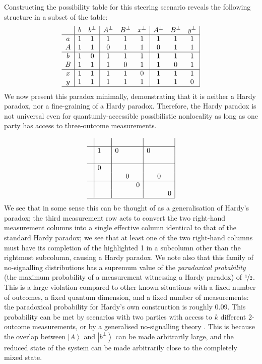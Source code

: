 \documentclass[reprint]{revtex4-1}
\theoremstyle{definition}
\newcommand{\ket}[1]{{\left\vert{#1}\right\rangle}}
\begin{document}
Constructing the possibility table for this steering scenario reveals the following structure in a subset of the table:
\begin{equation*}
\begin{array}{ c  | c c | c c c| c c c|}\
  & b&b^\perp& A^\perp &B^\perp&x^\perp& A^\perp &B^\perp&y^\perp \\ \hline
  a &1&1&1&1&1&1&1&1\\ 
  A &1&1&0&1&1&0&1&1\\ \hline
  b &1&0&1&1&1&1&1&1\\ 
 B  &1&1&1&0&1&1&0&1\\ \hline
 x &1&1&1&1&0&1&1&1\\ 
 y &1&1&1&1&1&1&1&0\\ \hline
\end{array}
\end{equation*}
We now present this paradox minimally, demonstrating that it is neither a Hardy paradox, nor a fine-graining of a Hardy paradox. Therefore, the Hardy paradox is not universal even for quantumly-accessible possibilistic nonlocality as long as one party has access to three-outcome measurements. 

\begin{equation*}
\begin{array}{ c | c c | c c c| c c c|}
&&&&&&&& \\ \hline
&1&&0&&&0&&\\
   &&&&&&&&\\ \hline
   &0&&&&&&&\\ 
  &&&&0&&&0&\\ \hline
  &&&&&0&&&\\ 
  &&&&&&&&0\\ \hline
\end{array}
\end{equation*}
We see that in some sense this can be thought of as a generalisation of Hardy's paradox; the third measurement row acts to convert the two right-hand measurement columns into a single effective column identical to that of the standard Hardy paradox; we see that at least one of the two right-hand columns must have its completion of the highlighted 1 in a subcolumn other than the rightmost subcolumn, causing a Hardy paradox. We note also that this family of no-signalling distributions has a supremum value of the \emph{paradoxical probability} (the maximum probability of a measurement witnessing a Hardy paradox) of $\nicefrac{1}{2}$. This is a large violation compared to other known situations with a fixed number of outcomes, a fixed quantum dimension, and a fixed number of measurements: the paradoxical probability for Hardy's own construction is roughly 0.09. This probability can be met by scenarios with two parties with access to $k$ different 2-outcome measurements, or by a generalised no-signalling theory \cite{Mans2017}. This is because the overlap between $\ket{A}$ and $\ket{b^\perp}$ can be made arbitrarily large, and the reduced state of the system can be made arbitrarily close to the completely mixed state.
\end{document}
